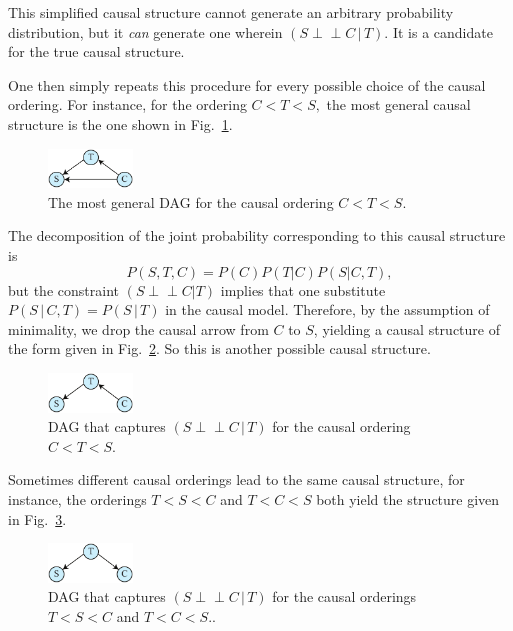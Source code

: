 \documentclass[letterpaper,onecolumn,nofootinbib]{revtex4}
\def\indep{\perp\!\!\!\!\perp}
\begin{document}
This simplified causal structure cannot generate an arbitrary probability
distribution, but it \emph{can }generate one wherein $(S\indep C\,|\,T).$
It is a candidate for the true causal structure.


One then simply repeats this procedure for every possible choice of the
causal ordering. For instance, for the ordering $C<T<S,$ the most general
causal structure is the one shown in Fig.~\ref{fig:smoke-CTS-gen}.
\begin{figure}[h]
	\centering
	\includegraphics[width=0.2\textwidth]{smoke-rev-gen}
 \caption{The most general DAG for the causal ordering $C<T<S$.}
       \label{fig:smoke-CTS-gen}
\end{figure}
The decomposition of the joint probability corresponding to this causal structure is%
\begin{equation*}
P(S,T,C)=P(C)P(T|C)P(S|C,T),
\end{equation*}%
but the constraint $(S\indep C|T)$ implies that one substitute $P(S\,|\,C,T)=P(S\,|\,T)$
in the causal model.  Therefore, by the assumption of minimality, we drop the causal arrow
from $C$ to $S$, yielding 
a causal structure of the form given in Fig.~\ref{fig:smoke-CTS-ind}. So this is another possible causal structure.
\begin{figure}[h]
	\centering
	\includegraphics[width=0.2\textwidth]{smoke-rev-ind}
 \caption{DAG that captures $(S\indep C\,|\, T)$ for the causal ordering $C<T<S$.}
       \label{fig:smoke-CTS-ind}
\end{figure}


Sometimes different causal orderings lead to the same causal structure, for
instance, the orderings $T<S<C$ and $T<C<S$ both yield the structure given in Fig.~\ref{fig:smoke-TSC-ind}. %
\begin{figure}[h]
	\centering
	\includegraphics[width=0.2\textwidth]{smoke-TSC-ind}
 \caption{DAG that captures $(S\indep C\,|\, T)$ for the causal orderings $T<S<C$ and $T<C<S$..}
       \label{fig:smoke-TSC-ind}
\end{figure}
\end{document}
